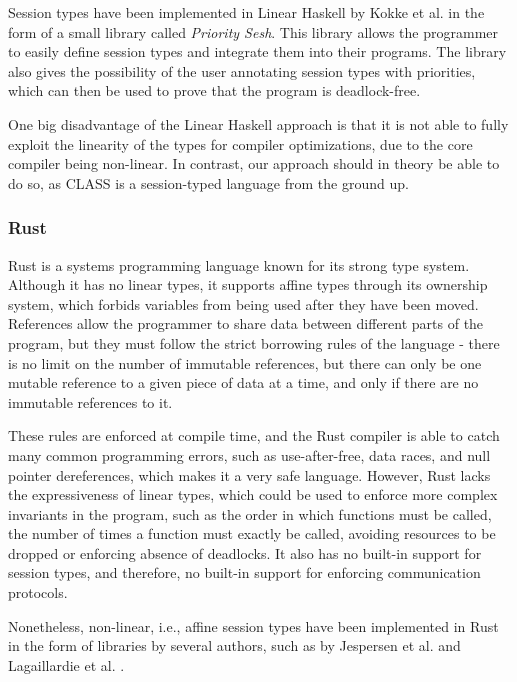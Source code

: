 Session types have been implemented in Linear Haskell by Kokke et al. \cite{Kokke:2021} in the form of a small library called \textit{Priority Sesh}. This library allows the programmer to easily define session types and integrate them into their programs. The library also gives the possibility of the user annotating session types with priorities, which can then be used to prove that the program is deadlock-free.

One big disadvantage of the Linear Haskell approach is that it is not able to fully exploit the linearity of the types for compiler optimizations, due to the core compiler being non-linear. In contrast, our approach should in theory be able to do so, as CLASS is a session-typed language from the ground up.

\subsubsection{Rust}

Rust is a systems programming language known for its strong type system. Although it has no linear types, it supports affine types through its ownership system, which forbids variables from being used after they have been moved. References allow the programmer to share data between different parts of the program, but they must follow the strict borrowing rules of the language - there is no limit on the number of immutable references, but there can only be one mutable reference to a given piece of data at a time, and only if there are no immutable references to it.

These rules are enforced at compile time, and the Rust compiler is able to catch many common programming errors, such as use-after-free, data races, and null pointer dereferences, which makes it a very safe language. However, Rust lacks the expressiveness of linear types, which could be used to enforce more complex invariants in the program, such as the order in which functions must be called, the number of times a function must exactly be called, avoiding resources to be dropped or enforcing absence of deadlocks. It also has no built-in support for session types, and therefore, no built-in support for enforcing communication protocols.

Nonetheless, non-linear, i.e., affine session types have been implemented in Rust in the form of libraries by several authors, such as by Jespersen et al. \cite{Jespersen:2015} and Lagaillardie et al. \cite{Lagaillardie:2022}.
